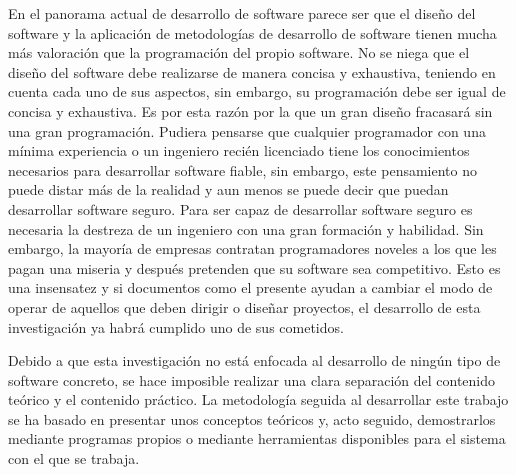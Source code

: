 \documentclass [titlepage, 12pt]{article}
\begin{document}
En el panorama actual de desarrollo de software parece ser que el dise\~no del software y la aplicaci\'on de metodolog\'ias de desarrollo de software tienen mucha m\'as valoraci\'on que la programaci\'on del propio software. No se niega que el dise\~no del software debe realizarse de manera concisa y exhaustiva, teniendo en cuenta cada uno de sus aspectos, sin embargo, su programaci\'on debe ser igual de concisa y exhaustiva. Es por esta raz\'on por la que un gran dise\~no fracasar\'a sin una gran programaci\'on. Pudiera pensarse que cualquier programador con una m\'inima experiencia o un ingeniero reci\'en licenciado tiene los conocimientos necesarios para desarrollar software fiable, sin embargo, este pensamiento no puede distar m\'as de la realidad y aun menos se puede decir que puedan desarrollar software seguro. Para ser capaz de desarrollar software seguro es necesaria la destreza de un ingeniero con una gran formaci\'on y habilidad. Sin embargo, la mayor\'ia de empresas contratan programadores noveles a los que les pagan una miseria y despu\'es pretenden que su software sea competitivo. Esto es una insensatez y si documentos como el presente ayudan a cambiar el modo de operar de aquellos que deben dirigir o dise\~nar proyectos, el desarrollo de esta investigaci\'on ya habr\'a cumplido uno de sus cometidos.\bigskip

Debido a que esta investigaci\'on no est\'a enfocada al desarrollo de ning\'un tipo de software concreto, se hace imposible realizar una clara separaci\'on del contenido te\'orico y el contenido pr\'actico. La metodolog\'ia seguida al desarrollar este trabajo se ha basado en presentar unos conceptos te\'oricos y, acto seguido, demostrarlos mediante programas propios o mediante herramientas disponibles para el sistema con el que se trabaja.\bigskip
\end{document}
